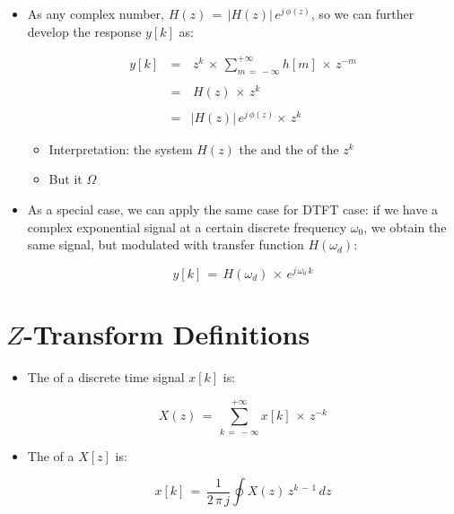 \documentclass[12pt,a4paper]{book}
\begin{document}
\begin{itemize}
\begin{itemize}
	
	\end{itemize}

\newpage
\item As any complex number, $H(z) \, = \, |H(z)| \, e^{j \, \phi(z)}$, so we can further develop the response $y[k]$ as:

\begin{equation}
\begin{array}{rcl}
y[k] \, &=& \, z^k \, \times \, \displaystyle\sum_{m \, = \, - \infty}^{+ \infty} h[m] \, \times \, z^{-m} \\ \\
&=& \, H(z) \, \times \, z^k \\ \\
&=& |H(z)| \, e^{j \, \phi(z)}   \times \, z^k 
\end{array}
\end{equation}

	\begin{itemize}
	\item Interpretation: the system $H(z)$  the  and the  of the  $z^k$
	
	\item But it  $\Omega$
	\end{itemize}

\item As a special case, we can apply the same case for DTFT case: if we have a complex exponential signal at a certain discrete frequency $\omega_0$, we obtain the same signal, but modulated with transfer function $H(\omega_d)$:

\begin{equation}
y[k] \, = \, H(\omega_d) \, \times \, e^{j \, \omega_0 \, k}        
\end{equation}

\end{itemize}

\section{$Z$-Transform Definitions}


\begin{itemize}

\item  The  of a discrete time signal $x[k]$ is:

\begin{equation}
X(z) \, = \, \displaystyle\sum_{k \, = \, - \infty}^{+ \infty} x[k] \, \times \, z^{-k}
\label{Eq:z_transform:definition_bilateral} 
\end{equation}


\item  The  of a $X[z]$ is:

\begin{equation}
x[k] \, = \, \displaystyle\frac{1}{2 \, \pi \, j} \displaystyle\oint X(z) \, z^{k \, - \, 1} \, dz
\end{equation}


\end{itemize}
\end{document}
